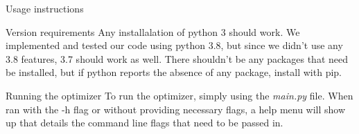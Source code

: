 \documentclass[letterpaper,12pt]{article}
\theoremstyle{definition}
\begin{document}
	\begin{section}{Usage instructions}
		\begin{subsection}{Version requirements}
			Any installalation of python 3 should work. We implemented and tested our code using python 3.8, but since we didn't use any 3.8 features, 3.7 should work as well. There shouldn't be any packages that need be installed, but if python reports the absence of any package, install with pip.
		\end{subsection}

		\begin{subsection}{Running the optimizer}
			To run the optimizer, simply using the \textit{main.py} file. When ran with the -h flag or without providing necessary flags, a help menu will show up that details the command line flags that need to be passed in.
		\end{subsection}
	\end{section}
\end{document}
